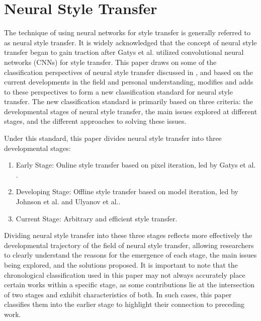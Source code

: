 \documentclass[preprint,12pt]{elsarticle}
\begin{document}
% 
% 
% 
\section{Neural Style Transfer}

The technique of using neural networks for style transfer is generally referred to as neural style transfer. It is widely acknowledged that the concept of neural style transfer began to gain traction after Gatys et al.\citep{02gatys2016image} utilized convolutional neural networks (CNNs) for style transfer. This paper draws on some of the classification perspectives of neural style transfer discussed in \citep{01jing2019neural}, and based on the current developments in the field and personal understanding, modifies and adds to these perspectives to form a new classification standard for neural style transfer. The new classification standard is primarily based on three criteria: the developmental stages of neural style transfer, the main issues explored at different stages, and the different approaches to solving these issues.

Under this standard, this paper divides neural style transfer into three developmental stages:
\begin{enumerate}
    \item Early Stage: Online style transfer based on pixel iteration, led by Gatys et al. \citep{02gatys2016image}.
    \item Developing Stage: Offline style transfer based on model iteration, led by Johnson et al.\citep{22johnson2016perceptual} and Ulyanov et al.\citep{23ulyanov2016texture}.
    \item Current Stage: Arbitrary and efficient style transfer.
\end{enumerate}

Dividing neural style transfer into these three stages reflects more effectively the developmental trajectory of the field of neural style transfer, allowing researchers to clearly understand the reasons for the emergence of each stage, the main issues being explored, and the solutions proposed. It is important to note that the chronological classification used in this paper may not always accurately place certain works within a specific stage, as some contributions lie at the intersection of two stages and exhibit characteristics of both. In such cases, this paper classifies them into the earlier stage to highlight their connection to preceding work.
\end{document}
